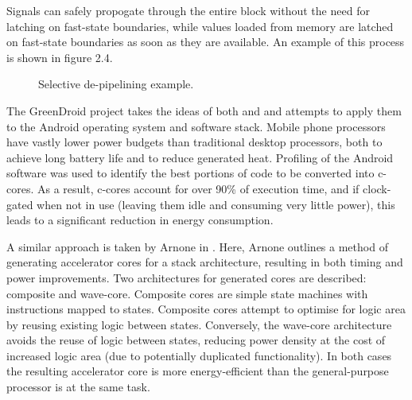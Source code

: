 \documentclass{UoYCSproject}
\begin{document}
Signals can safely propogate through the entire block without the need for latching on fast-state boundaries,
while values loaded from memory are latched on fast-state boundaries as soon as they are available.
An example of this process is shown in figure 2.4.

\begin{figure}[h]
\caption{Selective de-pipelining example. \cite{eco-cores}}
\end{figure}

The GreenDroid project \cite{greendroid} takes the ideas of both \cite{c-cores} and \cite{eco-cores} and attempts
to apply them to the Android operating system and software stack. Mobile phone processors have vastly lower power budgets than
traditional desktop processors, both to achieve long battery life and to reduce generated heat. Profiling of the Android
software was used to identify the best portions of code to be converted into c-cores. As a result,
c-cores account for over 90\% of execution time, and if clock-gated when not in use (leaving them idle and consuming
very little power), this leads to a significant reduction in energy consumption.

A similar approach is taken by Arnone in \cite{arnone-thesis}. Here, Arnone outlines a method of
generating accelerator cores for a stack architecture, resulting in both timing
and power improvements. Two architectures for generated cores are described: composite and wave-core.
Composite cores are simple state machines with instructions mapped to states. Composite cores attempt to
optimise for logic area by reusing existing logic between states. Conversely, the wave-core
architecture avoids the reuse of logic between states, reducing power density at the cost of increased
logic area (due to potentially duplicated functionality). In both cases the resulting accelerator core is
more energy-efficient than the general-purpose processor is at the same task.
\end{document}

